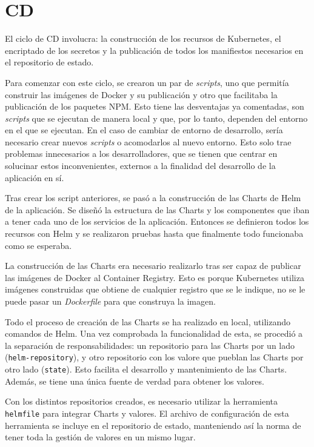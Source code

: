 \section{CD}

El ciclo de CD involucra: la construcción de los recursos de Kubernetes, el encriptado de los secretos y la publicación de todos los manifiestos necesarios en el repositorio de estado.

Para comenzar con este ciclo, se crearon un par de \textit{scripts}, uno que permitía construir las imágenes de Docker y su publicación y otro que facilitaba la publicación de los paquetes NPM. Esto tiene las desventajas ya comentadas, son \textit{scripts} que se ejecutan de manera local y que, por lo tanto, dependen del entorno en el que se ejecutan. En el caso de cambiar de entorno de desarrollo, sería necesario crear nuevos \textit{scripts} o acomodarlos al nuevo entorno. Esto solo trae problemas innecesarios a los desarrolladores, que se tienen que centrar en solucinar estos inconvenientes, externos a la finalidad del desarrollo de la aplicación en sí.

Tras crear los script anteriores, se pasó a la construcción de las Charts de Helm de la aplicación. Se diseñó la estructura de las Charts y los componentes que iban a tener cada uno de los servicios de la aplicación. Entonces se definieron todos los recursos con Helm y se realizaron pruebas hasta que finalmente todo funcionaba como se esperaba.

La construcción de las Charts era necesario realizarlo tras ser capaz de publicar las imágenes de Docker al Container Registry. Esto es porque Kubernetes utiliza imágenes construidas que obtiene de cualquier registro que se le indique, no se le puede pasar un \textit{Dockerfile} para que construya la imagen.

Todo el proceso de creación de las Charts se ha realizado en local, utilizando comandos de Helm. Una vez comprobada la funcionalidad de esta, se procedió a la separación de responsabilidades: un repositorio para las Charts por un lado (\texttt{helm-repository}), y otro repositorio con los valore que pueblan las Charts por otro lado (\texttt{state}). Esto facilita el desarrollo y mantenimiento de las Charts. Además, se tiene una única fuente de verdad para obtener los valores.

Con los distintos repositorios creados, es necesario utilizar la herramienta \texttt{helmfile} para integrar Charts y valores. El archivo de configuración de esta herramienta se incluye en el repositorio de estado, manteniendo así la norma de tener toda la gestión de valores en un mismo lugar.

